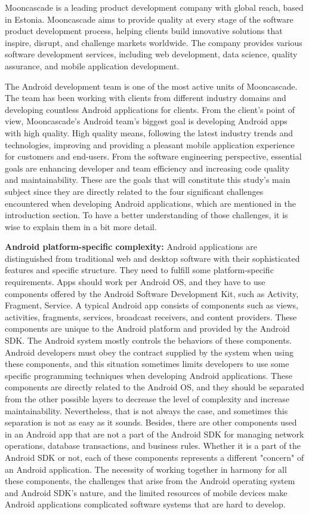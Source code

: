 Mooncascade is a leading product development company with global reach, based in Estonia. Mooncascade aims to provide quality at every stage of the software product development process, helping clients build innovative solutions that inspire, disrupt, and challenge markets worldwide. The company provides various software development services, including web development, data science, quality assurance, and mobile application development. 

The Android development team is one of the most active units of Mooncascade. The team has been working with clients from different industry domains and developing countless Android applications for clients. From the client's point of view, Mooncascade's Android team's biggest goal is developing Android apps with high quality. High quality means, following the latest industry trends and technologies, improving and providing a pleasant mobile application experience for customers and end-users. From the software engineering perspective, essential goals are enhancing developer and team efficiency and increasing code quality and maintainability. These are the goals that will constitute this study's main subject since they are directly related to the four significant challenges encountered when developing Android applications, which are mentioned in the introduction section. To have a better understanding of those challenges, it is wise to explain them in a bit more detail. 

\noindent\textbf{Android platform-specific complexity:} Android applications are distinguished from traditional web and desktop software with their sophisticated features and specific structure. They need to fulfill some platform-specific requirements. Apps should work per Android OS, and they have to use components offered by the Android Software Development Kit, such as Activity, Fragment, Service. A typical Android app consists of components such as views, activities, fragments, services, broadcast receivers, and content providers. These components are unique to the Android platform and provided by the Android SDK. The Android system mostly controls the behaviors of these components. Android developers must obey the contract supplied by the system when using these components, and this situation sometimes limits developers to use some specific programming techniques when developing Android applications. These components are directly related to the Android OS, and they should be separated from the other possible layers to decrease the level of complexity and increase maintainability. Nevertheless, that is not always the case, and sometimes this separation is not as easy as it sounds. Besides, there are other components used in an Android app that are not a part of the Android SDK for managing network operations, database transactions, and business rules. Whether it is a part of the Android SDK or not, each of these components represents a different "concern" of an Android application. The necessity of working together in harmony for all these components, the challenges that arise from the Android operating system and Android SDK's nature, and the limited resources of mobile devices make Android applications complicated software systems that are hard to develop. 


